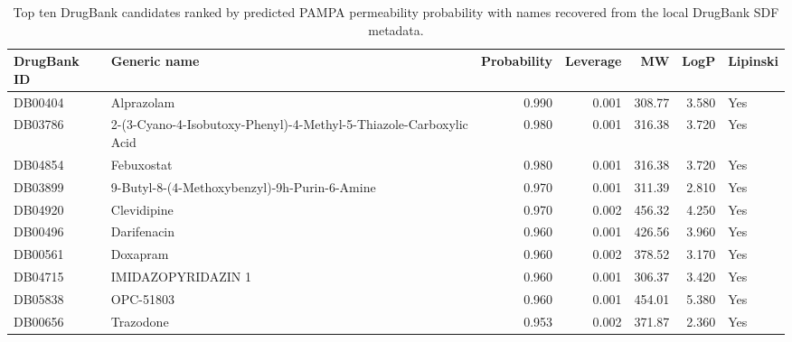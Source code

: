 \begin{table}[H]
\centering
\caption{Top ten DrugBank candidates ranked by predicted PAMPA permeability probability with names recovered from the local DrugBank SDF metadata.}
\label{tab:py_top_drugbank}
\begin{tabular}{lp{}rrrrl}
\toprule
DrugBank ID & Generic name & Probability & Leverage & MW & LogP & Lipinski \\
\midrule
DB00404 & Alprazolam & 0.990 & 0.001 & 308.77 & 3.580 & Yes \\
DB03786 & 2-(3-Cyano-4-Isobutoxy-Phenyl)-4-Methyl-5-Thiazole-Carboxylic Acid & 0.980 & 0.001 & 316.38 & 3.720 & Yes \\
DB04854 & Febuxostat & 0.980 & 0.001 & 316.38 & 3.720 & Yes \\
DB03899 & 9-Butyl-8-(4-Methoxybenzyl)-9h-Purin-6-Amine & 0.970 & 0.001 & 311.39 & 2.810 & Yes \\
DB04920 & Clevidipine & 0.970 & 0.002 & 456.32 & 4.250 & Yes \\
DB00496 & Darifenacin & 0.960 & 0.001 & 426.56 & 3.960 & Yes \\
DB00561 & Doxapram & 0.960 & 0.002 & 378.52 & 3.170 & Yes \\
DB04715 & IMIDAZOPYRIDAZIN 1 & 0.960 & 0.001 & 306.37 & 3.420 & Yes \\
DB05838 & OPC-51803 & 0.960 & 0.001 & 454.01 & 5.380 & Yes \\
DB00656 & Trazodone & 0.953 & 0.002 & 371.87 & 2.360 & Yes \\
\bottomrule
\end{tabular}
\end{table}
